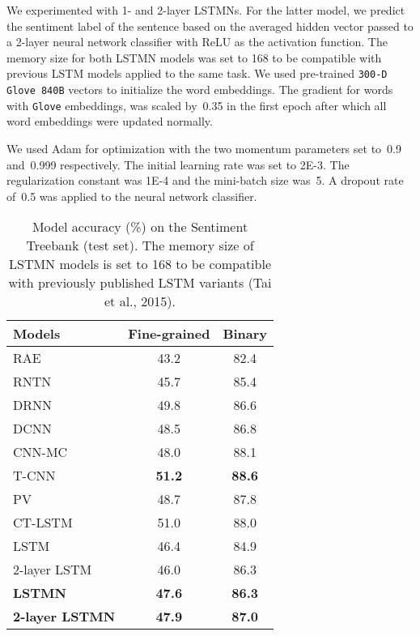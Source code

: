 \documentclass[11pt,letterpaper]{article}
\begin{document}
	
	We experimented with 1- and 2-layer LSTMNs.  For the latter
        model, we predict the sentiment label of the sentence based on
        the averaged hidden vector passed to a 2-layer neural network
        classifier with ReLU as the activation function.  The memory
        size for both LSTMN models was set to 168 to be compatible
        with previous LSTM models \cite{tai2015improved} applied to
        the same task.  We used pre-trained \texttt{300-D Glove 840B}
        vectors \cite{pennington2014glove} to initialize the word
        embeddings. The gradient for words with \texttt{Glove}
        embeddings, was scaled by~0.35 in the first epoch after which
        all word embeddings were updated normally.

        We used Adam \cite{kingma2014adam} for optimization with the
        two momentum parameters set to~0.9 and~0.999 respectively. The
        initial learning rate was set to 2E-3. The regularization
        constant was 1E-4 and the mini-batch size was~5. A dropout
        rate of~0.5 was applied to the neural network classifier.
	
\begin{table}[t]
		\centering
		\label{my-label}
		\small
		\begin{tabular}{|@{~}l@{~}|@{~}c@{~}|@{~}c@{~}|}
			\hline
			Models & Fine-grained& Binary \\
			\hline
			RAE {\scriptsize \cite{socher2011dynamic}} & 43.2 & 82.4 \\
			RNTN {\scriptsize \cite{socher2013recursive}} & 45.7 & 85.4 \\
			DRNN {\scriptsize \cite{irsoy2014deep}} & 49.8 &  86.6 \\ 
			\hline
			DCNN {\scriptsize \cite{blunsom2014convolutional}} & 48.5 & 86.8 \\
			CNN-MC {\scriptsize \cite{kim2014convolutional}} & 48.0 & 88.1 \\
			T-CNN {\scriptsize \cite{lei-barzilay-jaakkola:2015:EMNLP}} & \textbf{51.2} &
			\textbf{88.6} \\
			PV {\scriptsize \cite{le2014distributed}} & 48.7 &  87.8 \\
			\hline
			CT-LSTM {\scriptsize \cite{tai2015improved}} & 51.0 & 88.0 \\
			LSTM {\scriptsize \cite{tai2015improved}} & 46.4 & 84.9 \\
			2-layer LSTM {\scriptsize \cite{tai2015improved}} & 46.0 & 86.3 \\
			\textbf{LSTMN} & \textbf{47.6} & \textbf{86.3}\\
			\textbf{2-layer LSTMN} & \textbf{47.9} & \textbf{87.0}\\
			\hline
		\end{tabular}
		\caption{Model accuracy (\%) on the Sentiment
                  Treebank (test set). The memory size of LSTMN models
                  is set to 168 to be compatible with previously
                  published LSTM variants (Tai et al., 2015).}
		\label{sentiment}
		\vspace{-2.5ex}
	\end{table}
	
\end{document}

